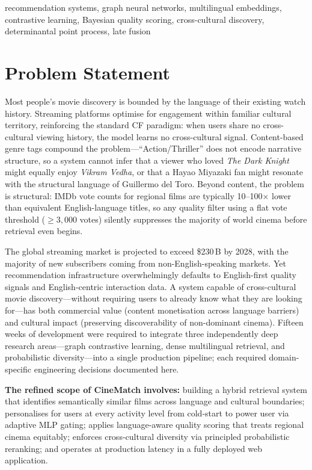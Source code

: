 \documentclass[conference]{IEEEtran}
\begin{document}
\begin{IEEEkeywords}
recommendation systems, graph neural networks, multilingual embeddings,
contrastive learning, Bayesian quality scoring, cross-cultural discovery,
determinantal point process, late fusion
\end{IEEEkeywords}

\section{Problem Statement}


Most people's movie discovery is bounded by the language of their existing
watch history.
Streaming platforms optimise for engagement within familiar cultural
territory, reinforcing the standard CF paradigm: when users share no
cross-cultural viewing history, the model learns no cross-cultural signal.
Content-based genre tags compound the problem---``Action/Thriller'' does
not encode narrative structure, so a system cannot infer that a viewer
who loved \emph{The Dark Knight} might equally enjoy \emph{Vikram Vedha},
or that a Hayao Miyazaki fan might resonate with the structural language of
Guillermo del Toro.
Beyond content, the problem is structural: IMDb vote counts for regional
films are typically 10--100$\times$ lower than equivalent English-language
titles, so any quality filter using a flat vote threshold ($\geq3{,}000$
votes) silently suppresses the majority of world cinema before retrieval
even begins.

The global streaming market is projected to exceed \$230\,B by 2028, with
the majority of new subscribers coming from non-English-speaking markets.
Yet recommendation infrastructure overwhelmingly defaults to English-first
quality signals and English-centric interaction data.
A system capable of cross-cultural movie discovery---without requiring users
to already know what they are looking for---has both commercial value
(content monetisation across language barriers) and cultural impact
(preserving discoverability of non-dominant cinema).
Fifteen weeks of development were required to integrate three independently
deep research areas---graph contrastive learning, dense multilingual
retrieval, and probabilistic diversity---into a single production pipeline;
each required domain-specific engineering decisions documented here.

\textbf{The refined scope of CineMatch involves:}
building a hybrid retrieval system that identifies semantically similar
films across language and cultural boundaries; personalises for users
at every activity level from cold-start to power user via adaptive MLP
gating; applies language-aware quality scoring that treats regional cinema
equitably; enforces cross-cultural diversity via principled probabilistic
reranking; and operates at production latency in a fully deployed web
application.
\end{document}
